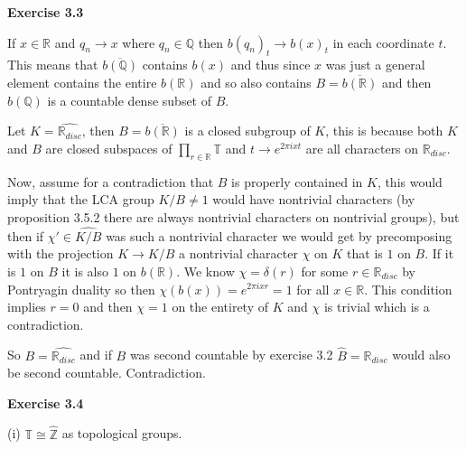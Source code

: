 \documentclass{article}
\begin{document}
\vspace{0.5cm}

\textbf{Exercise 3.3}

\vspace{0.5cm}

If $x \in \mathbb R$ and $q_n \rightarrow x$ where $q_n \in \mathbb Q$ then $b(q_n)_t \rightarrow b(x)_t$ in each coordinate $t$. This means that $\overline {b(\mathbb Q)}$ contains $b(x)$ and thus since $x$ was just a general element contains the entire $b(\mathbb R)$ and so also contains $ B =\overline {b(\mathbb R)}$ and then $b(\mathbb Q)$ is a countable dense subset of $B$.

\vspace{0.3cm}

Let $K = \widehat {\mathbb R_{disc}}$, then $B = \overline{b(\mathbb R)}$ is a closed subgroup of $K$, this is because both $K$ and $B$ are closed subspaces of $\prod \limits_{r \in \mathbb R} \mathbb T$ and $t \rightarrow e^{2 \pi ixt}$ are all characters on $\mathbb R_{disc}$.

\vspace{0.3cm}

Now, assume for a contradiction that $B$ is properly contained in $K$, this would imply that the LCA group $K/B \neq 1$ would have nontrivial characters (by proposition 3.5.2 there are always nontrivial characters on nontrivial groups), but then if $\chi' \in \widehat{K/B}$ was such a nontrivial character we would get by precomposing with the projection $K \rightarrow K/B$ a nontrivial character $\chi$ on $K$ that is $1$ on $B$. If it is $1$ on $B$ it is also $1$ on $b(\mathbb R)$. We know $\chi = \delta(r)$ for some $r \in \mathbb R_{disc}$ by Pontryagin duality so then $\chi(b(x)) =  e^{2\pi ixr} = 1$ for all $x \in \mathbb R$. This condition implies $r = 0$ and then $\chi = 1$ on the entirety of $K$ and $\chi$ is trivial which is a contradiction. 

\vspace{0.3cm}

So $B = \widehat{\mathbb R_{disc}}$ and if $B$ was second countable by exercise 3.2 $\widehat{B} = \mathbb R_{disc}$ would also be second countable. Contradiction.

\vspace{0.5cm}

\textbf{Exercise 3.4}

\vspace{0.5cm}

(i) $\mathbb T \cong \widehat{\mathbb Z}$ as topological groups.
\end{document}
